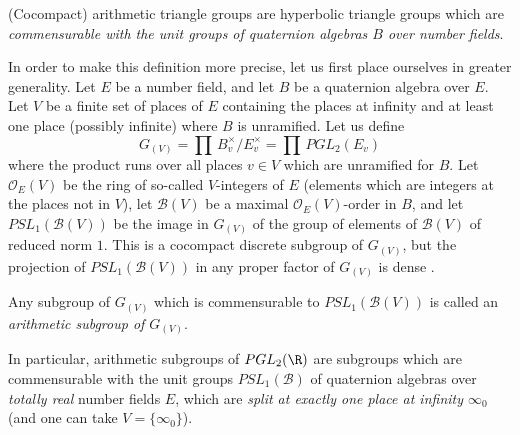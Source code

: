 \begin{para}\label{para::5.4.1} (Cocompact) arithmetic triangle groups
 are hyperbolic triangle groups which are {\it commensurable with the
 unit groups of quaternion algebras $B$ over number fields}.

 In order to make this definition more precise, let us first place
 ourselves in greater generality. Let $E$ be a number field, and let $B$
 be a quaternion algebra over $E$. Let $V$ be a finite set of places of
 $E$ containing the places at infinity and at least one place (possibly
 infinite) where $B$ is unramified. Let us define
 \begin{equation*}
  G_{(V)} = \prod \,B_v^\times/E_v^\times = \prod \, PGL_2(E_v)
 \end{equation*} where the product runs over all places $v\in V$ which
 are unramified for
 $B$. Let $\mathcal{O}_{E}(V)$ be the ring of so-called $V$-integers of
 $E$ (elements which are integers at the places not in $V$),
 let $\mathcal{B}(V)$ be a maximal $\mathcal{O}_{E}(V)$-order in
 $B$, and let $PSL_1(\mathcal{B}(V))$ be the image in $G_{(V)}$ of the
 group of elements of $\mathcal{B}(V)$ of reduced norm $1$. 
 This is a cocompact discrete subgroup of $ G_{(V)}$, but the projection
 of $PSL_1(\mathcal{B}(V))$ in any proper factor of 
 $G_{(V)}$ is dense \cite[IV.1.1]{adadq}. 

 Any subgroup of $G_{(V)}$ which is commensurable to
 $PSL_1(\mathcal{B}(V))$ is called an {\it arithmetic subgroup of $G_{(V)}$}. 

 \noindent In particular, arithmetic subgroups of $PGL_2(\R)$ are
 subgroups which are commensurable with the unit groups
 $PSL_1(\mathcal{B})$ of quaternion algebras over {\it totally real}
 number fields $E$, which are {\it split at exactly one place at
 infinity $\infty_0$} (and one can take $V=\{\infty_0\}$).
\end{para}


